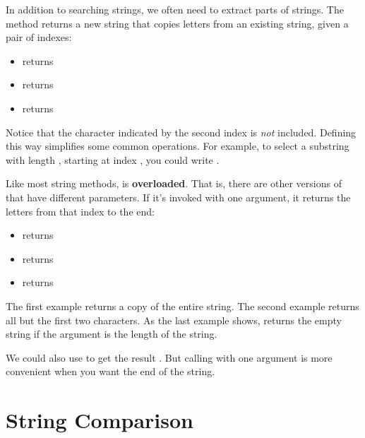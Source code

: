 
In addition to searching strings, we often need to extract parts of strings.
The  method returns a new string that copies letters from an existing string, given a pair of indexes:

\begin{itemize}
\item {} returns 
\item {} returns 
\item {} returns 
\end{itemize}

Notice that the character indicated by the second index is {\em not} included.
Defining  this way simplifies some common operations.
For example, to select a substring with length , starting at index , you could write .


Like most string methods,  is {\bf overloaded}.
That is, there are other versions of  that have different parameters.
If it's invoked with one argument, it returns the letters from that index to the end:

\begin{itemize}
\item {} returns 
\item {} returns 
\item {} returns 
\end{itemize}

The first example returns a copy of the entire string.
The second example returns all but the first two characters.
As the last example shows,  returns the empty string if the argument is the length of the string.

We could also use  to get the result .
But calling  with one argument is more convenient when you want the end of the string.


\section{String Comparison}
\label{strcmp}

